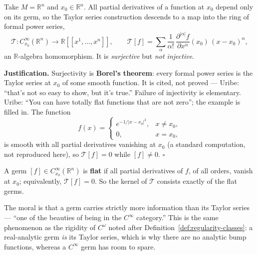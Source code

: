 \documentclass[11pt]{report}
\makeatletter
\newcounter{defcounter}[section]
\newcounter{excounter}[section]
\renewenvironment{proof}[1][Proof]{\noindent\textbf{#1.} }{\hfill$\square$\par\vspace{5pt}}
\newcommand{\deflabel}[1]{\edef\@currentlabel{\arabic{section}.\arabic{defcounter}}\label{#1}}
\newcommand{\exlabel}[1]{\edef\@currentlabel{\arabic{section}.\arabic{excounter}}\label{#1}}
\makeatother
\begin{document}
\begin{exbox}\exlabel{ex:taylor-germs}
Take $M = \mathbb{R}^n$ and $x_0 \in \mathbb{R}^n$. All partial derivatives of a function at $x_0$ depend only on its germ, so the Taylor series construction descends to a map into the ring of formal power series,
\[
\mathcal{T} : C_{x_0}^\infty(\mathbb{R}^n) \longrightarrow \mathbb{R}[[x^1, \ldots, x^n]], \qquad
\mathcal{T}[f] = \sum_{\alpha} \frac{1}{\alpha!}\, \frac{\partial^{|\alpha|} f}{\partial x^\alpha}(x_0)\, (x - x_0)^\alpha ,
\]
an $\mathbb{R}$-algebra homomorphism. It is \emph{surjective} but \emph{not injective}.
\end{exbox}

\begin{proof}[Justification]
Surjectivity is \textbf{Borel's theorem}: every formal power series is the Taylor series at $x_0$ of some smooth function. It is cited, not proved --- Uribe: ``that's not so easy to show, but it's true.'' Failure of injectivity is elementary. Uribe: ``You can have totally flat functions that are not zero''; the example is filled in. The function
\[
f(x) = \begin{cases} e^{-1/|x-x_0|^2}, & x \neq x_0,\\ 0, & x = x_0,\end{cases}
\]
is smooth with all partial derivatives vanishing at $x_0$ (a standard computation, not reproduced here), so $\mathcal{T}[f] = 0$ while $[f] \neq 0$.
\end{proof}

\begin{defbox}\deflabel{def:flat-germ}
A germ $[f] \in C_{x_0}^\infty(\mathbb{R}^n)$ is \textbf{flat} if all partial derivatives of $f$, of all orders, vanish at $x_0$; equivalently, $\mathcal{T}[f] = 0$. So the kernel of $\mathcal{T}$ consists exactly of the flat germs.
\end{defbox}

\begin{rembox}\label{rem:abstract-tangent-3}
The moral is that a germ carries strictly more information than its Taylor series --- ``one of the beauties of being in the $C^\infty$ category.'' This is the same phenomenon as the rigidity of $C^\omega$ noted after Definition~\ref{def:regularity-classes}: a real-analytic germ \emph{is} its Taylor series, which is why there are no analytic bump functions, whereas a $C^\infty$ germ has room to spare.
\end{rembox}

\end{document}
